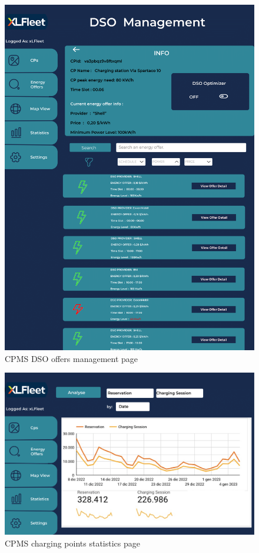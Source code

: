 \documentclass{Configuration_Files/PoliMi3i_thesis}
\begin{document}
\begin{figure}[H]
    \centering
    \includegraphics[width=1\textwidth]{Images/user-interface/cpms/CPMS-6.png}
    \caption{CPMS DSO offers management page}
\end{figure}

\begin{figure}[H]
    \centering
    \includegraphics[width=1\textwidth]{Images/user-interface/cpms/CPMS-7.png}
    \caption{CPMS charging points statistics page}
\end{figure}
\end{document}
